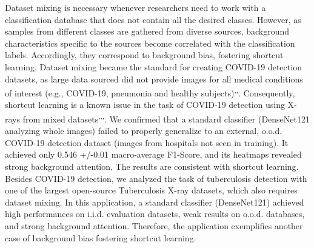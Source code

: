 \documentclass[fleqn,10pt]{wlscirep}
\begin{document}
{Dataset mixing is necessary whenever researchers need to work with a classification database that does not contain all the desired classes. However, as samples from different classes are gathered from diverse sources, background characteristics specific to the sources become correlated with the classification labels. Accordingly, they correspond to background bias, fostering shortcut learning\cite{ShortcutLearning}. Dataset mixing became the standard for creating COVID-19 detection datasets, as large data sourced did not provide images for all medical conditions of interest (e.g., COVID-19, pneumonia and healthy subjects)\cite{BrixiaSet}\textsuperscript{,}\cite{BimcvSet}\textsuperscript{,}\cite{GitCovidSet}. Consequently, shortcut learning is a known issue in the task of COVID-19 detection using X-rays from mixed datasets\cite{bassiCovid}\textsuperscript{,}\cite{critic}\textsuperscript{,}\cite{NatureCovidBias}\textsuperscript{,}\cite{ShortcutCovid}. We confirmed that a standard classifier (DenseNet121 analyzing whole images) failed to properly generalize to an external, o.o.d. COVID-19 detection dataset (images from hospitals not seen in training). It achieved only 0.546 +/-0.01 macro-average F1-Score, and its heatmaps revealed strong background attention. The results are consistent with shortcut learning. Besides COVID-19 detection, we analyzed the task of tuberculosis detection with one of the largest open-source Tuberculosis X-ray datasets\cite{TBPortals}, which also requires dataset mixing. In this application, a standard classifier (DenseNet121) achieved high performances on i.i.d. evaluation datasets, weak results on o.o.d. databases, and strong background attention. Therefore, the application exemplifies another case of background bias fostering shortcut learning. 

}
\end{document}
